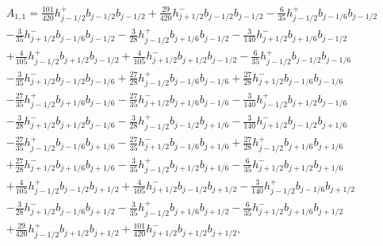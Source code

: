 \documentclass[12pt]{article}
\begin{document}
\begin{multline*} A_{1,1} = \frac{101}{420} h_{j-1/2}^+ b_{j-1/2} b_{j-1/2}+\frac{29}{420} h_{j+1/2}^- b_{j-1/2} b_{j-1/2}-\frac{6}{35} h_{j-1/2}^+ b_{j-1/6} b_{j-1/2}\\-\frac{3}{35} h_{j+1/2}^- b_{j-1/6} b_{j-1/2}-\frac{3}{28} h_{j-1/2}^+ b_{j+1/6} b_{j-1/2}-\frac{3}{140} h_{j+1/2}^- b_{j+1/6} b_{j-1/2}\\+\frac{4}{105} h_{j-1/2}^+ b_{j+1/2} b_{j-1/2}+\frac{4}{105} h_{j+1/2}^- b_{j+1/2} b_{j-1/2}-\frac{6}{35} h_{j-1/2}^+ b_{j-1/2} b_{j-1/6}\\-\frac{3}{35} h_{j+1/2}^- b_{j-1/2} b_{j-1/6}+\frac{27}{28} h_{j-1/2}^+ b_{j-1/6} b_{j-1/6}+\frac{27}{28} h_{j+1/2}^- b_{j-1/6} b_{j-1/6}\\-\frac{27}{35} h_{j-1/2}^+ b_{j+1/6} b_{j-1/6}-\frac{27}{35} h_{j+1/2}^- b_{j+1/6} b_{j-1/6}-\frac{3}{140} h_{j-1/2}^+ b_{j+1/2} b_{j-1/6}\\-\frac{3}{28} h_{j+1/2}^- b_{j+1/2} b_{j-1/6}-\frac{3}{28} h_{j-1/2}^+ b_{j-1/2} b_{j+1/6}-\frac{3}{140} h_{j+1/2}^- b_{j-1/2} b_{j+1/6}\\-\frac{27}{35} h_{j-1/2}^+ b_{j-1/6} b_{j+1/6}-\frac{27}{35} h_{j+1/2}^- b_{j-1/6} b_{j+1/6}+\frac{27}{28} h_{j-1/2}^+ b_{j+1/6} b_{j+1/6}\\+\frac{27}{28} h_{j+1/2}^- b_{j+1/6} b_{j+1/6}-\frac{3}{35} h_{j-1/2}^+ b_{j+1/2} b_{j+1/6}-\frac{6}{35} h_{j+1/2}^- b_{j+1/2} b_{j+1/6}\\+\frac{4}{105} h_{j-1/2}^+ b_{j-1/2} b_{j+1/2}+\frac{4}{105} h_{j+1/2}^- b_{j-1/2} b_{j+1/2}-\frac{3}{140} h_{j-1/2}^+ b_{j-1/6} b_{j+1/2}\\-\frac{3}{28} h_{j+1/2}^- b_{j-1/6} b_{j+1/2}-\frac{3}{35} h_{j-1/2}^+ b_{j+1/6} b_{j+1/2}-\frac{6}{35} h_{j+1/2}^- b_{j+1/6} b_{j+1/2}\\+\frac{29}{420} h_{j-1/2}^+ b_{j+1/2} b_{j+1/2}+\frac{101}{420} h_{j+1/2}^- b_{j+1/2} b_{j+1/2}, \end{multline*}
\end{document}
